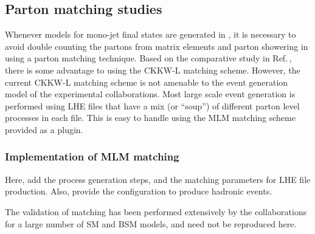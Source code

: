 \subsection{Parton matching studies}
\label{sec:monojet_parton_match}

Whenever models for mono-jet final states are generated in  \madgraph,
it is necessary to avoid double counting the partons from matrix elements and parton showering in \pythiaEight
using a parton matching technique. Based on the comparative study 
in Ref.\,\cite{Alwall:0706.2569}, there is
some advantage to using the CKKW-L matching scheme.
However, the current CKKW-L matching scheme is not amenable to the
event generation model of the experimental collaborations.
Most large scale event generation is performed using LHE files that
have a mix (or ``soup'') of different parton level processes in each file.
This is easy to handle using the MLM matching scheme provided as
a \pythiaEight plugin.

\subsubsection{Implementation of MLM matching}
\label{sec:match_implementation}


Here, add the process generation steps, and the matching parameters for
LHE file production.  Also, provide the \pythiaEight configuration to
produce hadronic events.

The validation of matching has been performed extensively by the collaborations for a large number of SM and BSM models, and need not be reproduced here.





